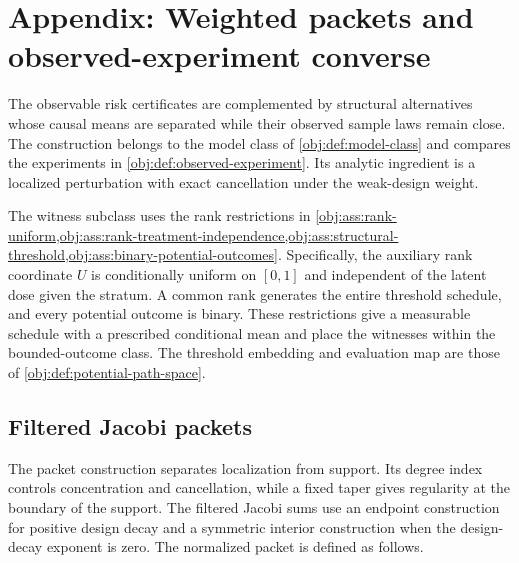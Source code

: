 \section{Appendix: Weighted packets and observed-experiment converse}

The observable risk certificates are complemented by structural alternatives whose causal means are separated while their observed sample laws remain close. The construction belongs to the model class of \cref{obj:def:model-class} and compares the experiments in \cref{obj:def:observed-experiment}. Its analytic ingredient is a localized perturbation with exact cancellation under the weak-design weight.

The witness subclass uses the rank restrictions in \cref{obj:ass:rank-uniform,obj:ass:rank-treatment-independence,obj:ass:structural-threshold,obj:ass:binary-potential-outcomes}. Specifically, the auxiliary rank coordinate \(U\) is conditionally uniform on \([0,1]\) and independent of the latent dose given the stratum. A common rank generates the entire threshold schedule, and every potential outcome is binary. These restrictions give a measurable schedule with a prescribed conditional mean and place the witnesses within the bounded-outcome class. The threshold embedding and evaluation map are those of \cref{obj:def:potential-path-space}.

\subsection{Filtered Jacobi packets}

The packet construction separates localization from support. Its degree index  controls concentration and cancellation, while a fixed taper gives regularity at the boundary of the support. The filtered Jacobi sums  use an endpoint construction for positive design decay and a symmetric interior construction when the design-decay exponent is zero. The normalized packet  is defined as follows.

